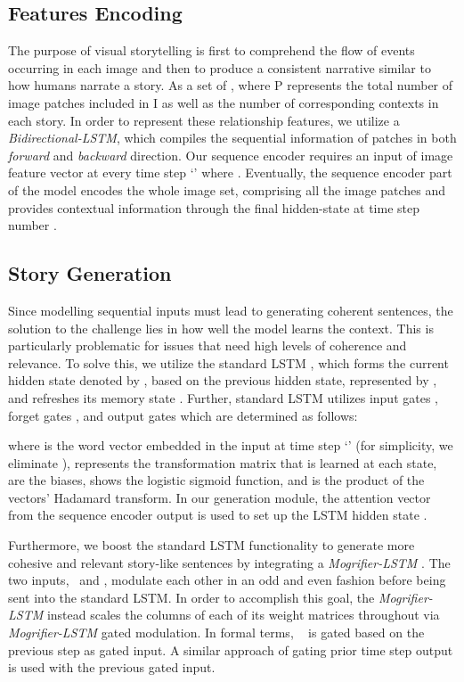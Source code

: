 \documentclass[runningheads]{llncs}
\begin{document}
\subsection{Features Encoding}
The purpose of visual storytelling is first to comprehend the flow of events occurring in each image and then to produce a consistent narrative similar to how humans narrate a story. As a set of , where P represents the total number of image patches included in I as well as the number of corresponding contexts in each story.
In order to represent these relationship features, we utilize a {\em Bidirectional-LSTM}, which compiles the sequential information of  patches in both {\em forward} and {\em backward} direction. Our sequence encoder requires an input of image feature vector  at every time step `' where . Eventually, the sequence encoder part of the model encodes the whole image set, comprising all the image patches and provides contextual information  through the final hidden-state at time step number . 




\subsection{Story Generation}
Since modelling sequential inputs must lead to generating coherent sentences, the solution to the challenge lies in how well the model learns the context. This is particularly problematic for issues that need high levels of coherence and relevance. To solve this, we utilize the standard LSTM \cite{hochreiter1997long}, which forms the current hidden state denoted by , based on the previous hidden state, represented by , and refreshes its memory state . Further, standard LSTM utilizes input gates , forget gates , and output gates  which are determined as follows:






where  is the word vector embedded in the input at time step `' (for simplicity, we eliminate ),  represents the transformation matrix that is learned at each state,  are the biases,  shows the logistic sigmoid function, and  is the product of the vectors' Hadamard transform. In our generation module, the attention vector  from the sequence encoder output is used to set up the LSTM hidden state . 




Furthermore, we boost the standard LSTM functionality to generate more cohesive and relevant story-like sentences by integrating a {\em Mogrifier-LSTM} \cite{melis2019mogrifier}. The two inputs,~ and , modulate each other in an odd and even fashion before being sent into the standard LSTM. In order to accomplish this goal, the {\em Mogrifier-LSTM} instead scales the columns of each of its weight matrices throughout  via {\em Mogrifier-LSTM} gated modulation. In formal terms, ~ is gated based on the previous step  as gated input. A similar approach of gating prior time step output is used with the previous gated input. 
\end{document}
